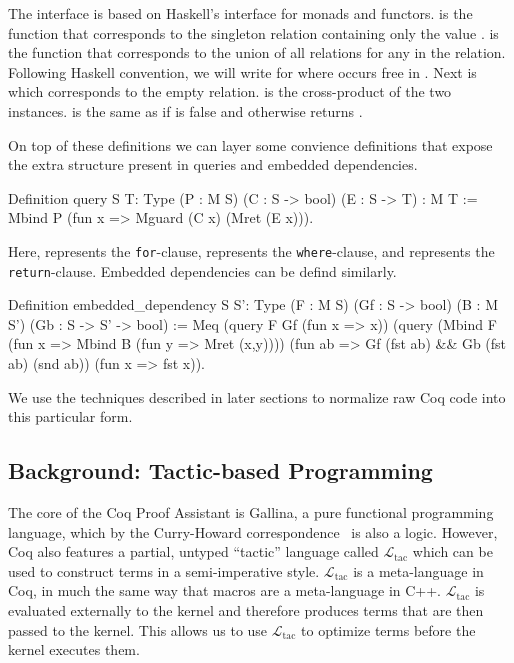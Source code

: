 \documentclass[preprint]{sigplanconf}
\newcommand{\ltac}[0]{\ensuremath{\mathcal{L}_{\mathrm{tac}}}}
\begin{document}
The interface is based on Haskell's interface for monads and functors.
 is the function that corresponds to the singleton relation containing only the value .
 is the function that corresponds to the union of all relations  for any  in the  relation.
Following Haskell convention, we will write  for  where  occurs free in .
Next is  which corresponds to the empty relation.
 is the cross-product of the two instances.
 is the same as  if  is false and otherwise returns .

On top of these definitions we can layer some convience definitions that expose the extra structure present in queries and embedded dependencies.
\begin{coq}
Definition query {S T: Type}
  (P : M S) (C : S -> bool) (E : S -> T) : M T :=
  Mbind P (fun x => Mguard (C x) (Mret (E x))).
\end{coq}
Here,  represents the {\tt for}-clause,  represents the {\tt where}-clause, and  represents the {\tt return}-clause.
Embedded dependencies can be defind similarly.
\begin{coq}
Definition embedded_dependency {S S': Type}
  (F : M S) (Gf : S -> bool) (B : M S') (Gb : S -> S' -> bool) :=
  Meq (query F Gf (fun x => x))
      (query (Mbind F (fun x => Mbind B (fun y => Mret (x,y))))
             (fun ab => Gf (fst ab) && Gb (fst ab) (snd ab))
             (fun x => fst x)).
\end{coq}

We use the techniques described in later sections to normalize raw Coq code into this particular form.

\subsection{Background: Tactic-based Programming}
\label{sec:tactic-based}

The core of the Coq Proof Assistant is Gallina, a pure functional programming language, which by the Curry-Howard correspondence~\cite{} is also a logic.
However, Coq also features a partial, untyped ``tactic'' language called \ltac{} which can be used to construct terms in a semi-imperative style.
\ltac{} is a meta-language in Coq, in much the same way that macros are a meta-language in C++.
\ltac{} is evaluated externally to the kernel and therefore produces terms that are then passed to the kernel.
This allows us to use \ltac{} to optimize terms before the kernel executes them.
\end{document}
